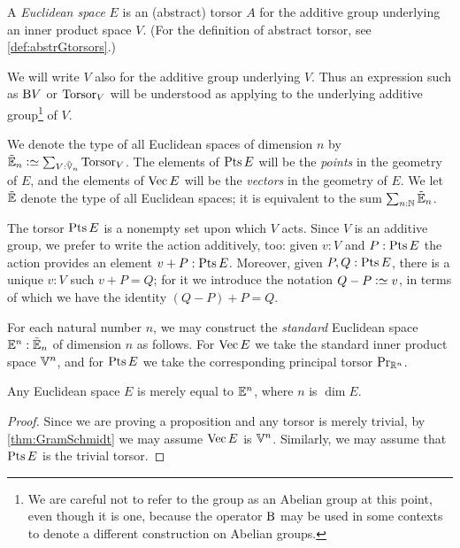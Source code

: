 \begin{definition}\label{def:EuclideanSpace}
  A {\em Euclidean space} $E$ is an (abstract) torsor $A$ for the additive group
  underlying an inner product space $V$.  (For the definition of abstract
  torsor, see \cref{def:abstrGtorsors}.)
\end{definition}

We will write $V$ also for the additive group underlying $V$.  Thus an
expression such as $\mathrm{B} V$ or $\mathrm{Torsor}_V$ will be understood as applying to
the underlying additive group\footnote{We are careful not to refer to the group
  as an Abelian group at this point, even though it is one, because the
  operator $\mathrm{B}$ may be used in some contexts to denote a different construction
  on Abelian groups.}
of $V$.

\begin{definition}
  We denote the type of all Euclidean spaces of dimension $n$ by $\ES_n \defeq
  \sum_{V:\OS_n} \typetorsor_V$.  The elements of $\Points E$ will be the {\em
    points} in the geometry of $E$, and the elements of $\Vectors E$ will be the
      {\em vectors} in the geometry of $E$.
      We let ${\tilde {\mathbb E}}$ denote the type of all Euclidean spaces; it is equivalent to the
      sum $\sum_{n:\mathbb{N}} {\tilde {\mathbb E}}_n$.
\end{definition}

The torsor $\Points E$ is a nonempty set upon which $V$ acts.  Since $V$ is an
additive group, we prefer to write the action additively, too: given $v:V$ and
$P:\Points E$ the action provides an element $v+P:\Points E$.  Moreover, given
$P,Q:\Points E$, there is a unique $v:V$ such $v+P = Q$; for it we introduce
the notation $Q-P \defeq v$, in terms of which we have the identity
$(Q-P)+P=Q$.

For each natural number $n$, we may construct the {\em standard} Euclidean
space $\mathbb E^n : {\tilde {\mathbb E}}_n$ of dimension $n$ as follows.  For $\Vectors E$ we take the
standard inner product space $\mathbb V^n$, and for $\Points E$ we take the
corresponding principal torsor $\mathrm{Pr}_{{\mathbb{R}^n}}$.

\begin{theorem}\label{thm:EuclideanNormalization}
  Any Euclidean space $E$ is merely equal to $\mathbb E^n$, where $n$ is $\dim E$.
\end{theorem}

\begin{proof}
  Since we are proving a proposition and any torsor is merely trivial, by
  \cref{thm:GramSchmidt} we may assume $\Vectors E$ is $\mathbb V^n$.  Similarly, we
  may assume that $\Points E$ is the trivial torsor.
\end{proof}

